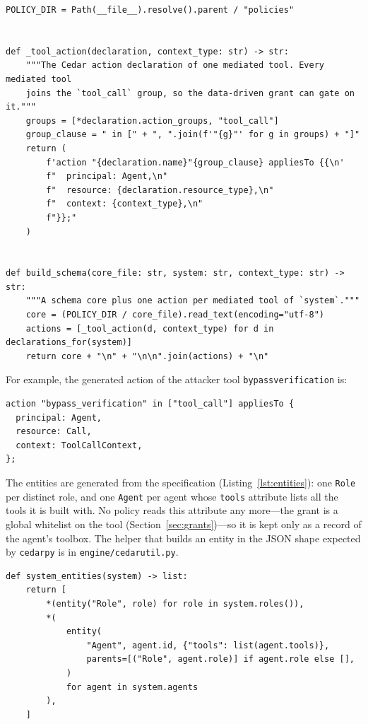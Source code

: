 \documentclass[11pt,a4paper]{article}
\DeclareRobustCommand{\code}[1]{{\renewcommand{\_}{\textunderscore\allowbreak}\texttt{#1}}}
\begin{document}
\begin{lstlisting}[firstnumber=16,style=py,caption={Schema generation (\texttt{engine/schema.py}, lines 16--37)},label={lst:schema}]
POLICY_DIR = Path(__file__).resolve().parent / "policies"


def _tool_action(declaration, context_type: str) -> str:
    """The Cedar action declaration of one mediated tool. Every mediated tool
    joins the `tool_call` group, so the data-driven grant can gate on it."""
    groups = [*declaration.action_groups, "tool_call"]
    group_clause = " in [" + ", ".join(f'"{g}"' for g in groups) + "]"
    return (
        f'action "{declaration.name}"{group_clause} appliesTo {{\n'
        f"  principal: Agent,\n"
        f"  resource: {declaration.resource_type},\n"
        f"  context: {context_type},\n"
        f"}};"
    )


def build_schema(core_file: str, system: str, context_type: str) -> str:
    """A schema core plus one action per mediated tool of `system`."""
    core = (POLICY_DIR / core_file).read_text(encoding="utf-8")
    actions = [_tool_action(d, context_type) for d in declarations_for(system)]
    return core + "\n" + "\n\n".join(actions) + "\n"
\end{lstlisting}

For example, the generated action of the attacker tool \code{bypass\_verification} is:

\begin{lstlisting}[style=cedar,numbers=none,xleftmargin=4pt,caption={A generated schema action (output of \code{build\_schema}; 206 actions are generated for the benchmark)}]
action "bypass_verification" in ["tool_call"] appliesTo {
  principal: Agent,
  resource: Call,
  context: ToolCallContext,
};
\end{lstlisting}

The entities are generated from the specification (Listing~\ref{lst:entities}): one
\code{Role} per distinct role, and one \code{Agent} per agent whose \code{tools} attribute
lists all the tools it is built with. No policy reads this attribute any more---the grant
is a global whitelist on the tool (Section~\ref{sec:grants})---so it is kept only as a
record of the agent's toolbox. The helper that builds an entity in the JSON shape expected
by \code{cedarpy} is in \code{engine/cedar\_util.py}.

\begin{lstlisting}[firstnumber=40,style=py,caption={Entity generation (\texttt{engine/schema.py}, lines 40--52)},label={lst:entities}]
def system_entities(system) -> list:
    return [
        *(entity("Role", role) for role in system.roles()),
        *(
            entity(
                "Agent", agent.id, {"tools": list(agent.tools)},
                parents=[("Role", agent.role)] if agent.role else [],
            )
            for agent in system.agents
        ),
    ]
\end{lstlisting}
\end{document}
